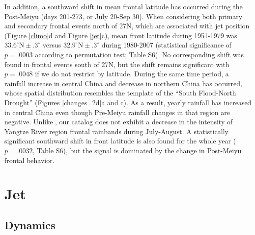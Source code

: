 \documentclass[draft,grl]{AGUTeX}
\begin{document}
\begin{article}
	In addition, a southward shift in mean frontal latitude has occurred during the Post-Meiyu (days 201-273, or July 20-Sep 30). When considering both primary and secondary frontal events north of 27\textdegree N, which are associated with jet position (Figure \ref{climo}d and Figure \ref{jet}c), mean front latitude during 1951-1979 was $33.6^\circ \textrm{N} \pm .3^\circ$ versus $32.9^\circ \textrm{N} \pm .3^\circ$ during 1980-2007 (statistical significance of $p=.0003$ according to permutation test; Table S6). No corresponding shift was found in frontal events south of 27N, but the shift remains significant with $p=.0048$ if we do not restrict by latitude. During the same time period, a rainfall increase in central China and decrease in northern China has occurred, whose spatial distribution resembles the template of the ``South Flood-North Drought'' (Figures \ref{changes_2d}a and c). As a result, yearly rainfall has increased in central China even though Pre-Meiyu rainfall changes in that region are negative. Unlike \citet{Yu2010}, our catalog does not exhibit a decrease in the intensity of Yangtze River region frontal rainbands during July-August. A statistically significant southward shift in front latitude is also found for the whole year ($p=.0032$, Table S6), but the signal is dominated by the change in Post-Meiyu frontal behavior.
	
\section{Jet}

\subsection{Dynamics}


\end{article}
\end{document}

